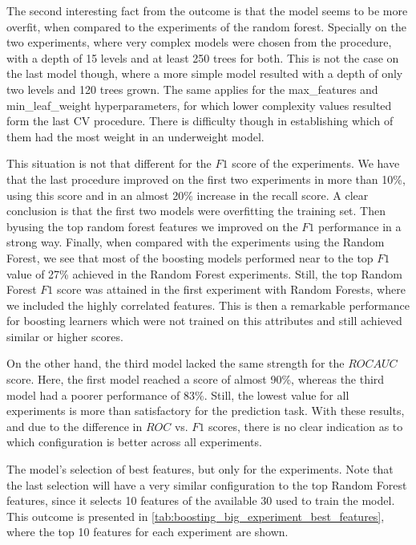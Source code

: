 The second interesting fact from the outcome is that the model seems to be more overfit, when compared to the experiments of the random forest.
Specially on the two experiments, where very complex models were chosen from the procedure, with a depth of 15 levels and at least 250 trees for both.
This is not the case on the last model though, where a more simple model resulted with a depth of only two levels and 120 trees grown.
The same applies for the max\_features and min\_leaf\_weight hyperparameters, for which lower complexity values resulted form the last CV procedure.
There is difficulty though in establishing which of them had the most weight in an underweight model.

This situation is not that different for the $F1$ score of the experiments.
We have that the last procedure improved on the first two experiments in more than 10\%, using this score and in an almost 20\% increase in the recall score.
A clear conclusion is that the first two models were overfitting the training set.
Then byusing the top random forest features we improved on the $F1$ performance in a strong way.
Finally, when compared with the experiments using the Random Forest, we see that most of the boosting models performed near to the top $F1$ value of 27\% achieved in the Random Forest experiments.
Still, the top Random Forest $F1$ score was attained in the first experiment with Random Forests, where we included the highly correlated features.
This is then a remarkable performance for boosting learners which were not trained on this attributes and still achieved similar or higher scores.


On the other hand, the third model lacked the same strength for the $ROC AUC$ score.
Here, the first model reached a score of almost 90\%, whereas the third model had a poorer performance of 83\%.
Still, the lowest value for all experiments is more than satisfactory for the prediction task.
With these results, and due to the difference in $ROC$ vs. $F1$ scores, there is no clear indication as to which configuration is better across all experiments.


The model's selection of best features, but only for the experiments.
Note that the last selection will have a very similar configuration to the top Random Forest features, since it selects 10 features of the available 30 used to train the model.
This outcome is presented in \cref{tab:boosting_big_experiment_best_features}, where the top 10 features for each experiment are shown.


